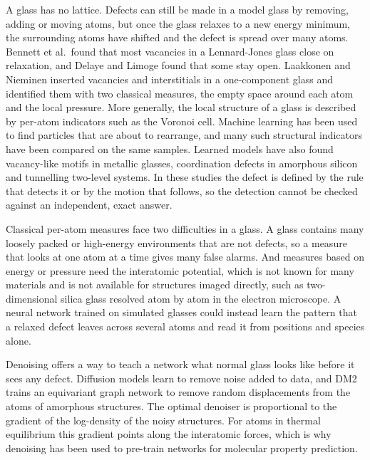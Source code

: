 \documentclass[11pt]{article}
\begin{document}
A glass has no lattice\citep{zachariasen1932}. Defects can still be made in a model glass by removing, adding or moving atoms, but once the glass relaxes to a new energy minimum, the surrounding atoms have shifted and the defect is spread over many atoms. Bennett et al.\ found that most vacancies in a Lennard-Jones glass close on relaxation\citep{bennett1979}, and Delaye and Limoge found that some stay open\citep{delaye1993}. Laakkonen and Nieminen inserted vacancies and interstitials in a one-component glass and identified them with two classical measures, the empty space around each atom and the local pressure\citep{laakkonen1988}. More generally, the local structure of a glass is described by per-atom indicators such as the Voronoi cell\citep{starr2002}. Machine learning has been used to find particles that are about to rearrange\citep{cubuk2015}, and many such structural indicators have been compared on the same samples\citep{richard2020}. Learned models have also found vacancy-like motifs in metallic glasses\citep{yuan2023}, coordination defects in amorphous silicon\citep{morrow2024} and tunnelling two-level systems\citep{ciarella2023}. In these studies the defect is defined by the rule that detects it or by the motion that follows, so the detection cannot be checked against an independent, exact answer.

Classical per-atom measures face two difficulties in a glass. A glass contains many loosely packed or high-energy environments that are not defects, so a measure that looks at one atom at a time gives many false alarms. And measures based on energy or pressure need the interatomic potential, which is not known for many materials and is not available for structures imaged directly, such as two-dimensional silica glass resolved atom by atom in the electron microscope\citep{huang2012}. A neural network trained on simulated glasses could instead learn the pattern that a relaxed defect leaves across several atoms and read it from positions and species alone.

Denoising offers a way to teach a network what normal glass looks like before it sees any defect. Diffusion models learn to remove noise added to data\citep{ho2020ddpm,song2021sde}, and DM2 trains an equivariant graph network to remove random displacements from the atoms of amorphous structures\citep{yang2026dm2}. The optimal denoiser is proportional to the gradient of the log-density of the noisy structures\citep{vincent2011,efron2011}. For atoms in thermal equilibrium this gradient points along the interatomic forces, which is why denoising has been used to pre-train networks for molecular property prediction\citep{zaidi2023}.
\end{document}
